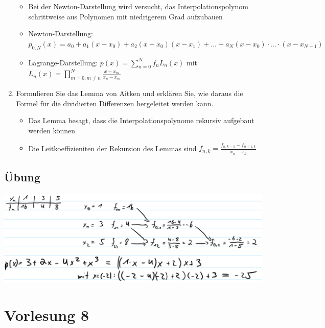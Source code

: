 \documentclass[]{article}
\begin{document}
\begin{enumerate}
			\begin{itemize}
				\item Bei der Newton-Darstellung wird versucht, das Interpolationspolynom schrittweise aus Polynomen mit niedrigerem Grad aufzubauen
				\item Newton-Darstellung: $p_{0,N}(x) = a_0 + a_1(x - x_0) + a_2(x - x_0)(x - x_1) + \dots + a_N(x-x_0) \cdot \dots \cdot (x-x_{N-1})$
				\item Lagrange-Darstellung: $p(x) = \sum_{n=0}^{N} f_n L_n(x)$ mit $L_n(x) = \prod_{m=0, m \neq n}^{N} \frac{x-x_m}{x_n - x_m}$
			\end{itemize}
		\item Formulieren Sie das Lemma von Aitken und erklären Sie, wie daraus die Formel für die dividierten Differenzen hergeleitet werden kann.
			\begin{itemize}
				\item Das Lemma besagt, dass die Interpolationspolynome rekursiv aufgebaut werden können
				\item Die Leitkoeffizieniten der Rekursion des Lemmas sind $f_{n,k} = \frac{f_{n,k-1} - f_{n+1,k}}{x_n - x_k}$
			\end{itemize}
	\end{enumerate}
\subsection{Übung}
	\includegraphics[width=\textwidth]{res/vl7-1.png}
	\includegraphics[width=\textwidth]{res/vl7-2.png}	

\section{Vorlesung 8}
\end{document}
